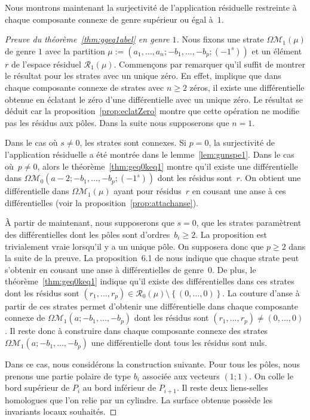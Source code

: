 \documentclass[JEP,XML,SOM,Unicode,francais,NoFloatCountersInSection,published]{cedram}
\let\mathcal\mathscr
\newcommand{\espres}[1][g]{\mathcal{R}_{#1}}
\newcommand{\omoduli}[1][g]{{\Omega\mathcal M}_{\!#1}}
\theoremstyle{definition}
\begin{document}
Nous montrons maintenant la surjectivité de l'application résiduelle restreinte à chaque composante connexe de genre supérieur ou égal à~$1$.
\begin{proof}[Preuve du théorème~\ref{thm:ggeq1abel} en genre $1$]
Nous fixons une strate $\omoduli[1](\mu)$ de genre $1$ avec la partition $\mu:=(a_{1},\dots,a_{n};-b_{1},\dots,-b_{p};(-1^{s}))$ et un élément $r$ de l'espace résiduel $\espres[1](\mu)$.
Commençons par remarquer qu'il suffit de montrer le résultat pour les strates avec un unique zéro. En effet, \cite[Prop.\,7.1]{Bo} implique que dans chaque composante connexe de strates avec $n\geq2$ zéros, il existe une différentielle obtenue en éclatant le zéro d'une différentielle avec un unique zéro. Le résultat se déduit car la proposition~\ref{prop:eclatZero} montre que cette opération ne modifie pas les résidus aux pôles. Dans la suite nous supposerons que $n=1$.

Dans le cas où $s\neq0$, les strates sont connexes. Si $p = 0$, la surjectivité de l'application résiduelle a été montrée dans le lemme~\ref{lem:gunspe1}.
Dans le cas où~$p\neq0$, alors le théorème~\ref{thm:geq0keq1} montre qu'il existe une différentielle dans $\omoduli[0](a-2;-b_{1},\dots,-b_{p};(-1^{s}))$ dont les résidus sont~$r$. On obtient une différentielle dans $\omoduli[1](\mu)$ ayant pour résidus~$r$ en cousant une anse à ces différentielles (voir la proposition~\ref{prop:attachanse}).

À partir de maintenant, nous supposerons que $s=0$, \ie que les strates paramètrent des différentielles dont les pôles sont d'ordres~$b_{i}\geq 2$. La proposition est trivialement vraie lorsqu'il y a un unique pôle. On supposera donc que $p\geq2$ dans la suite de la preuve. La proposition~6.1 de \cite{Bo} nous indique que chaque strate peut s'obtenir en cousant une anse à différentielles de genre~$0$. De plus, le théorème~\ref{thm:geq0keq1} indique qu'il existe des différentielles dans ces strates dont les résidus sont $(r_{1},\dots,r_{p})\in \espres[0](\mu)\setminus\left\{(0,\dots,0)\right\}$. La couture d'anse à partir de ces strates permet d'obtenir une différentielle dans chaque composante connexe de $\omoduli[1](a;-b_{1},\dots,-b_{p})$ dont les résidus sont $(r_{1},\dots,r_{p}) \neq (0,\dots,0)$. Il reste donc à construire dans chaque composante connexe des strates $\omoduli[1](a;-b_{1},\dots,-b_{p})$ une différentielle dont tous les résidus sont nuls.

Dans ce cas, nous considérons la construction suivante. Pour tous les pôles, nous prenons une partie polaire de type $b_{i}$ associée aux vecteurs $(1;1)$. On colle le bord supérieur de $P_{i}$ au bord inférieur de $P_{i+1}$.
Il reste deux liens-selles homologues que l'on relie par un cylindre. La surface obtenue possède les invariants locaux souhaités.


\end{proof}
\end{document}
